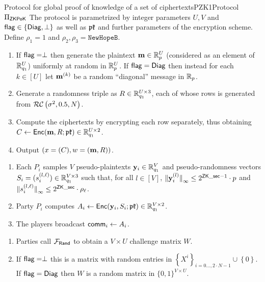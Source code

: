 \begin{Boxfig}{Protocol for global proof of knowledge of a set of ciphertexts}{PZK1}{Protocol $\Pi_{\mathsf{ZKPoK}}$}
The protocol is parametrized by integer parameters $U,V$ and 
$\mathsf{flag}  \in \left\{ \mathsf{Diag}, \perp \right\}$ as well as $\mathfrak{pk}$ and further parameters of the encryption scheme.
Define $\rho_1=1$ and $\rho_2, \rho_3 = \texttt{NewHopeB}$.

\vspace{3mm}

\begin{enumerate}
\item If $\mathsf{flag}=\perp$ then generate the plaintext $\mathbf{m} \in \mathbb{R}_p^U$ (considered
  as an element of $\mathbb{R}_{q_1}^U$) uniformly at random in $\mathbb{R}_p^U$. If $\mathsf{flag}=\mathsf{Diag}$ then instead for each $k\in [U]$ let $\mathbf{m}^{(k)}$ be a random ``diagonal'' message in $\mathbb{R}_p$.
\item Generate a randomness triple as
$R \in \mathbb{R}_{q_1}^{U \times 3}$, each of whose rows is generated from $\mathcal{RC}\left( \sigma^2, 0.5, N \right)$.
\item Compute the ciphertexts by encrypting each row separately, thus obtaining
$C \leftarrow \mathsf{Enc}(\mathbf{m},R; \mathfrak{pk}) \in \mathbb{R}_{q_1}^{U \times 2}$.
\item Output $\left(x=(C),w=(\mathbf{m},R)\right)$.
\end{enumerate}

\vspace{3mm}

\begin{enumerate}
\item Each $P_i$ samples $V$ pseudo-plaintexts $\mathbf{y}_i \in \mathbb{R}_{q_1}^V$
  and pseudo-randomness vectors $S_i = (s_i^{(l,\ell)}) \in \mathbb{R}_{q_1}^{V \times 3}$ such that,
for all $l \in [V]$,
${\Vert \mathbf{y}_i^{(l)} \Vert}_\infty \le 2^{\mathsf{ZK\_sec}-1} \cdot p$
and
${\Vert s_i^{(l,\ell)} \Vert}_\infty \le 2^{\mathsf{ZK\_sec}} \cdot \rho_\ell$.
\item Party $P_i$ computes
  $A_i \leftarrow \mathsf{Enc}(\mathbf{y}_i,S_i; \mathfrak{pk}) \in \mathbb{R}_{q_1}^{V \times 2}$.
\item The players broadcast $\mathsf{comm}_i \leftarrow A_i$.
\end{enumerate}

\begin{enumerate}
  \item Parties call $\mathcal{F}_{\mathsf{Rand}}$ to obtain a $V \times U$ challenge matrix $W$.
  \item If $\mathsf{flag}=\perp$ this is a matrix with random entries in $\left\{ X^i \right\}_{i=0 \ldots, 2 \cdot N-1} \cup \left\{ 0 \right\}$. If $\mathsf{flag}=\mathsf{Diag}$ then $W$ is a random matrix in $\{0,1\}^{V\times U}$.
\end{enumerate}


\end{Boxfig}
